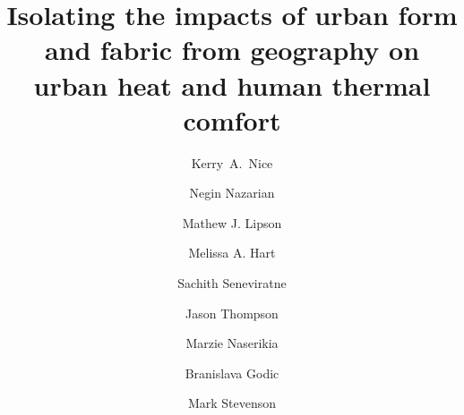 \documentclass[final,3p,times,authoryear]{elsarticle}
\begin{document}
\title{Isolating the impacts of urban form and fabric from geography on urban heat and human thermal comfort}

\author[melb]{Kerry~A.~Nice}
\author[arc,built]{Negin Nazarian}
\author[arc]{Mathew J. Lipson}
\author[arc]{Melissa A. Hart}
\author[melb]{Sachith Seneviratne}
\author[melb]{Jason Thompson}
\author[arc]{Marzie Naserikia}
\author[melb]{Branislava Godic}
\author[melb,eng]{Mark Stevenson}
\address[melb]{Transport, Health, and Urban Design Research Lab, Faculty of Architecture, Building, and Planning, University of Melbourne, VIC, Australia.}
\address[arc]{ARC Centre of Excellence for Climate Extremes, University of New South Wales, Sydney, NSW, Australia.}
\address[built]{School of Built Environment; and City Futures Research Centre, University of New South Wales, Sydney, NSW, Australia.}
\address[eng]{Melbourne School of Engineering; and Melbourne School of Population and Global Health, University of Melbourne, VIC, Australia.}
\end{document}

